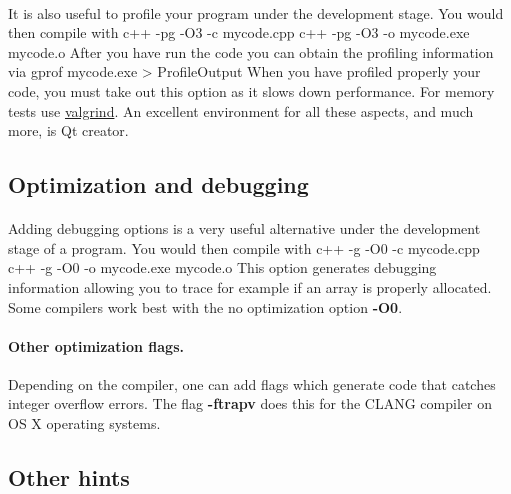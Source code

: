 \documentclass[%
oneside,                 %
final,                   %
10pt]{article}
\begin{document}
\paragraph{}
It is also useful to profile your program under the development stage.
You would then compile with 
\bcppcod
c++  -pg -O3 -c  mycode.cpp
c++  -pg -O3 -o  mycode.exe  mycode.o
\ecppcod
After you have run the code you can obtain the profiling information via
\bcppcod
gprof mycode.exe >  ProfileOutput
\ecppcod
When you have profiled properly your code, you must take out this option as it 
slows down performance.
For memory tests use \href{{http://www.valgrind.org}}{valgrind}. An excellent environment for all these aspects, and much  more, is  Qt creator.



\subsection{Optimization and debugging}

\paragraph{}
Adding debugging options is a very useful alternative under the development stage of a program.
You would then compile with 
\bcppcod
c++  -g -O0 -c  mycode.cpp
c++  -g -O0 -o  mycode.exe  mycode.o
\ecppcod
This option generates debugging information allowing you to trace for example if an array is properly allocated. Some compilers work best with the no optimization option \textbf{-O0}.



\paragraph{Other optimization flags.}
Depending on the compiler, one can add flags which generate code that catches integer overflow errors. 
The flag \textbf{-ftrapv} does this for the CLANG compiler on OS X operating systems.





\subsection{Other hints}
\end{document}
